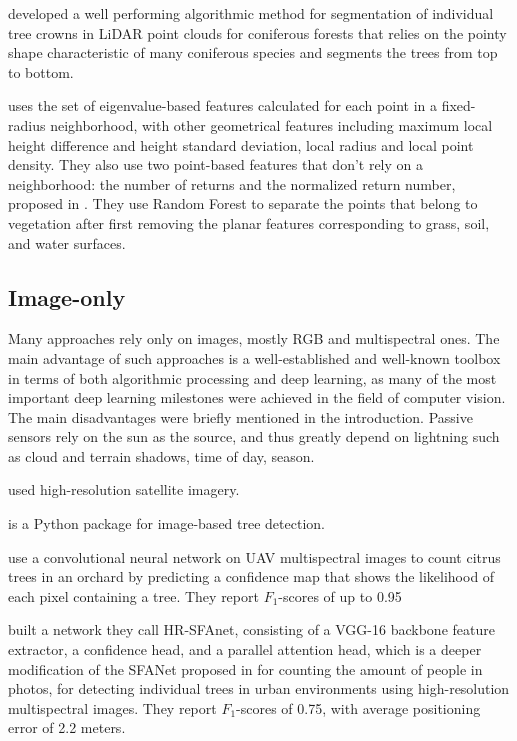 \cite{liNewMethodSegmenting2012} developed a well performing algorithmic method for segmentation of individual tree crowns in LiDAR point clouds for coniferous forests that relies on the pointy shape characteristic of many coniferous species and segments the trees from top to bottom.

\cite{lucasIdentificationLinearVegetation2019} uses the set of eigenvalue-based features calculated for each point in a fixed-radius neighborhood, with other geometrical features including maximum local height difference and height standard deviation, local radius and local point density.
They also use two point-based features that don't rely on a neighborhood: the number of returns and the normalized return number, proposed in \cite{guoRelevanceAirborneLidar2011}.
They use Random Forest to separate the points that belong to vegetation after first removing the planar features corresponding to grass, soil, and water surfaces.

\subsection{Image-only}

Many approaches rely only on images, mostly RGB and multispectral ones.
The main advantage of such approaches is a well-established and well-known toolbox in terms of both algorithmic processing and deep learning, as many of the most important deep learning milestones were achieved in the field of computer vision.
The main disadvantages were briefly mentioned in the introduction.
Passive sensors rely on the sun as the source, and thus greatly depend on lightning such as cloud and terrain shadows, time of day, season.

\cite{lassalleDeepLearningbasedIndividual2022} used high-resolution satellite imagery.

\cite{weinsteinDeepForestPythonPackage2020} is a Python package for image-based tree detection.

\cite{oscoConvolutionalNeuralNetwork2020} use a convolutional neural network on UAV multispectral images to count citrus trees in an orchard by predicting a confidence map that shows the likelihood of each pixel containing a tree.
They report $F_1$-scores of up to 0.95

\cite{venturaIndividualTreeDetection2024} built a network they call HR-SFAnet, consisting of a VGG-16 \cite{simonyanVeryDeepConvolutional2014} backbone feature extractor, a confidence head, and a parallel attention head, which is a deeper modification of the SFANet proposed in \cite{zhuDualPathMultiScale2019} for counting the amount of people in photos, for detecting individual trees in urban environments using high-resolution multispectral images.
They report $F_1$-scores of 0.75, with average positioning error of 2.2 meters.

